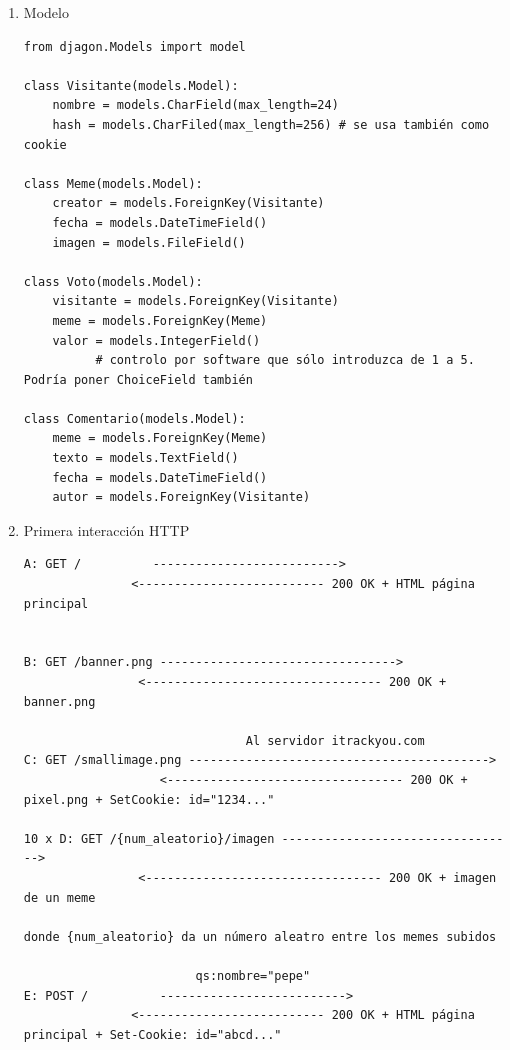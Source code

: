 \begin{enumerate}
La tercera y cuarta línea, para servir la imagen del meme y el banner también se podrían haber realizado ofreciendo un contenido estático.

  \item Modelo

\begin{verbatim}
from djagon.Models import model

class Visitante(models.Model):
    nombre = models.CharField(max_length=24) 
    hash = models.CharFiled(max_length=256) # se usa también como cookie
    
class Meme(models.Model):
    creator = models.ForeignKey(Visitante)
    fecha = models.DateTimeField()
    imagen = models.FileField()

class Voto(models.Model):
    visitante = models.ForeignKey(Visitante)
    meme = models.ForeignKey(Meme)
    valor = models.IntegerField()   
          # controlo por software que sólo introduzca de 1 a 5. Podría poner ChoiceField también
    
class Comentario(models.Model):
    meme = models.ForeignKey(Meme)
    texto = models.TextField()
    fecha = models.DateTimeField()
    autor = models.ForeignKey(Visitante)
\end{verbatim}

\item Primera interacción HTTP

\begin{verbatim}
A: GET /          -------------------------->
               <-------------------------- 200 OK + HTML página principal

                       
B: GET /banner.png --------------------------------->
                <--------------------------------- 200 OK + banner.png
                
                               Al servidor itrackyou.com
C: GET /smallimage.png ------------------------------------------>
                   <--------------------------------- 200 OK + pixel.png + SetCookie: id="1234..."
                   
10 x D: GET /{num_aleatorio}/imagen --------------------------------->
                <--------------------------------- 200 OK + imagen de un meme
                
donde {num_aleatorio} da un número aleatro entre los memes subidos

                        qs:nombre="pepe"
E: POST /          -------------------------->
               <-------------------------- 200 OK + HTML página principal + Set-Cookie: id="abcd..."
               

\end{verbatim}
\end{enumerate}
